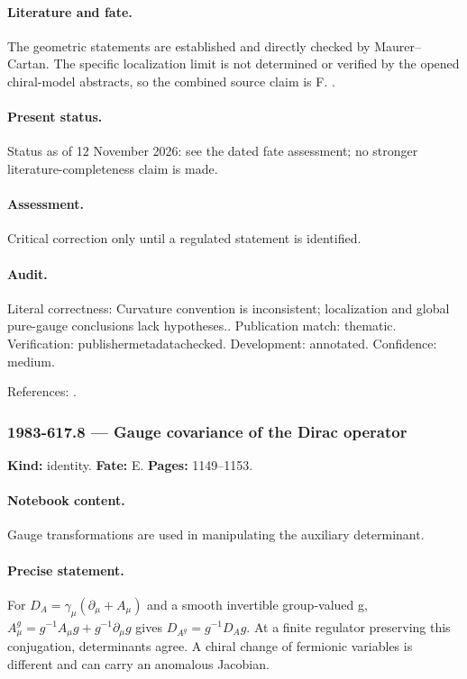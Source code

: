 \paragraph{Literature and fate.} The geometric statements are established and directly checked by Maurer--Cartan. The specific localization limit is not determined or verified by the opened chiral-model abstracts, so the combined source claim is F. \citep{polyakovwiegmann1983goldstone,polyakovwiegmann1984multivalued}.

\paragraph{Present status.} Status as of 12 November 2026: see the dated fate assessment; no stronger literature-completeness claim is made.

\paragraph{Assessment.} Critical correction only until a regulated statement is identified.

\paragraph{Audit.} Literal correctness: Curvature convention is inconsistent; localization and global pure-gauge conclusions lack hypotheses.. Publication match: thematic. Verification: publishermetadatachecked. Development: annotated. Confidence: medium.

\noindent References: \citep{polyakovwiegmann1983goldstone,polyakovwiegmann1984multivalued}.\par

\subsubsection{1983-617.8 --- Gauge covariance of the Dirac operator}

\label{item:1983-617.8}

\noindent\textbf{Kind:} identity. \textbf{Fate:} E. \textbf{Pages:} 1149--1153.\par

\paragraph{Notebook content.} Gauge transformations are used in manipulating the auxiliary determinant.

\paragraph{Precise statement.} For $D_A=\gamma_\mu(\partial_\mu+A_\mu)$ and a smooth invertible group-valued g, $A_\mu^g=g^{-1}A_\mu g+g^{-1}\partial_\mu g$ gives $D_{A^g}=g^{-1}D_Ag$. At a finite regulator preserving this conjugation, determinants agree. A chiral change of fermionic variables is different and can carry an anomalous Jacobian.

